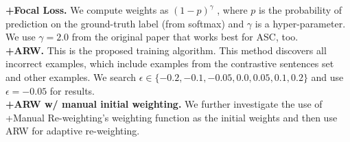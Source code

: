 \textbf{+Focal Loss.} We compute weights as $(1-p)^\gamma$ \cite{lin2017focal}, where $p$ is the probability of prediction on the ground-truth label (from softmax) and $\gamma$ is a hyper-parameter. We use $\gamma = 2.0 $ from the original paper that works best for ASC, too.\\ %
\textbf{+ARW.} This is the proposed training algorithm. This method discovers all incorrect examples, which include examples from the contrastive sentences set and other examples. We search $\epsilon \in \{-0.2, -0.1, -0.05, 0.0, 0.05, 0.1, 0.2\}$ and use $\epsilon = -0.05 $ for results.\\
\textbf{+ARW w/ manual initial weighting.} We further investigate the use of +Manual Re-weighting's weighting function as the initial weights and then use ARW for adaptive re-weighting.\\

